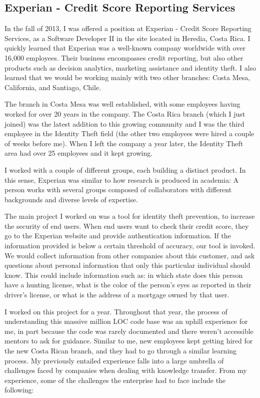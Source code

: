\documentclass[12pt, letterpaper]{article}
\begin{document}
\subsection{Experian - Credit Score Reporting Services}
In the fall of 2013, I was offered a position at Experian - Credit Score Reporting Services, as a Software Developer II in the site located in Heredia, Costa Rica.
I quickly learned that Experian was a well-known company worldwide with over 16,000
employees. Their business encompasses credit reporting, but also other products such as decision 
analytics, marketing assistance and identity theft. I also learned that we would be working mainly with two other branches: 
Costa Mesa, California, and Santiago, Chile. 

The branch in Costa Mesa was well established, with some employees having worked for over 20 years in the company. 
The Costa Rica branch (which I just joined) was the 
latest addition to this growing 
community and I was the third employee in the Identity Theft field (the other two employees were hired a couple of 
weeks before me). When I left the company a year later, the Identity Theft area had over 25 employees and it 
kept growing. 

I worked with a couple
of different groups, each building a distinct product. In this sense, Experian was
similar to how research 
is produced in academia: A person works with several groups composed of collaborators with different 
backgrounds and diverse levels of expertise.

The main project I worked on was a tool for identity theft prevention, to increase the security of end users.
When end users want to check their credit score, they go to the Experian website and provide authentication
information. If the information provided is below a certain threshold of accuracy, our tool is invoked. We would collect 
information from other companies about this customer, and ask questions about personal information that only this particular
individual should know. This could include information such as: in which state does this person have a hunting license, 
what is the color of the person's eyes as reported in their driver's license, or what is the address of a mortgage
owned by that user.

I worked on this project for a year. Throughout that year, the process of understanding this massive million LOC 
code base was an uphill experience for me, in part because the code was rarely documented
and there weren't accessible mentors to ask for guidance. Similar to me, new employees kept getting hired for the new Costa Rican 
branch, and they had to go through a similar learning process. My previously entailed experience falls into a large
umbrella of challenges faced by companies when dealing with knowledge transfer. 
From my experience, some of the challenges the enterprise had to face include the following:
\end{document}
